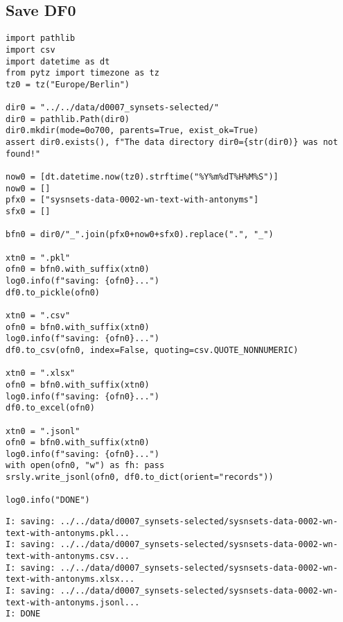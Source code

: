 \documentclass[a4paper,10pt,onecolumn,oneside,openright]{article}
\begin{document}
\subsection{Save DF0}
\label{sec:org362ae63}
\begin{verbatim}
import pathlib
import csv
import datetime as dt
from pytz import timezone as tz
tz0 = tz("Europe/Berlin")

dir0 = "../../data/d0007_synsets-selected/"
dir0 = pathlib.Path(dir0)
dir0.mkdir(mode=0o700, parents=True, exist_ok=True)
assert dir0.exists(), f"The data directory dir0={str(dir0)} was not found!"

now0 = [dt.datetime.now(tz0).strftime("%Y%m%dT%H%M%S")]
now0 = []
pfx0 = ["sysnsets-data-0002-wn-text-with-antonyms"]
sfx0 = []

bfn0 = dir0/"_".join(pfx0+now0+sfx0).replace(".", "_")

xtn0 = ".pkl"
ofn0 = bfn0.with_suffix(xtn0)
log0.info(f"saving: {ofn0}...")
df0.to_pickle(ofn0)

xtn0 = ".csv"
ofn0 = bfn0.with_suffix(xtn0)
log0.info(f"saving: {ofn0}...")
df0.to_csv(ofn0, index=False, quoting=csv.QUOTE_NONNUMERIC)

xtn0 = ".xlsx"
ofn0 = bfn0.with_suffix(xtn0)
log0.info(f"saving: {ofn0}...")
df0.to_excel(ofn0)

xtn0 = ".jsonl"
ofn0 = bfn0.with_suffix(xtn0)
log0.info(f"saving: {ofn0}...")
with open(ofn0, "w") as fh: pass
srsly.write_jsonl(ofn0, df0.to_dict(orient="records"))

log0.info("DONE")
\end{verbatim}

\begin{verbatim}
I: saving: ../../data/d0007_synsets-selected/sysnsets-data-0002-wn-text-with-antonyms.pkl...
I: saving: ../../data/d0007_synsets-selected/sysnsets-data-0002-wn-text-with-antonyms.csv...
I: saving: ../../data/d0007_synsets-selected/sysnsets-data-0002-wn-text-with-antonyms.xlsx...
I: saving: ../../data/d0007_synsets-selected/sysnsets-data-0002-wn-text-with-antonyms.jsonl...
I: DONE
\end{verbatim}
\end{document}
